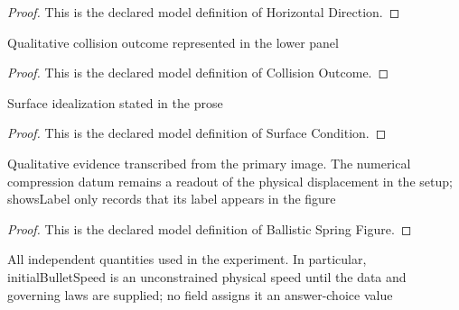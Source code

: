 \begin{proof}
  This is the declared model definition of Horizontal Direction.
\end{proof}
\begin{definition}
  \label{def:physics:phyx-mini-0202:phyxminiproblems-problemphyxmini0202-collisionoutcome}
  Qualitative collision outcome represented in the lower panel
\end{definition}
\begin{proof}
  This is the declared model definition of Collision Outcome.
\end{proof}
\begin{definition}
  \label{def:physics:phyx-mini-0202:phyxminiproblems-problemphyxmini0202-surfacecondition}
  Surface idealization stated in the prose
\end{definition}
\begin{proof}
  This is the declared model definition of Surface Condition.
\end{proof}
\begin{definition}
  \label{def:physics:phyx-mini-0202:phyxminiproblems-problemphyxmini0202-ballisticspringfigure}
  Qualitative evidence transcribed from the primary image. The numerical compression datum remains a readout of the physical displacement in the setup; showsLabel only records that its label appears in the figure
\end{definition}
\begin{proof}
  This is the declared model definition of Ballistic Spring Figure.
\end{proof}
\begin{definition}
  \label{def:physics:phyx-mini-0202:phyxminiproblems-problemphyxmini0202-ballisticspringsetup}
  All independent quantities used in the experiment. In particular, initialBulletSpeed is an unconstrained physical speed until the data and governing laws are supplied; no field assigns it an answer-choice value
\end{definition}
